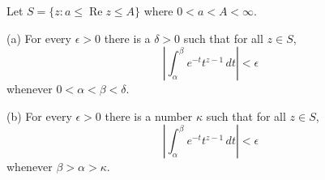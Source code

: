 Let $S = \{z : a \leq \operatorname{Re} z \leq A\}$ where $0 < a < A < \infty$.

(a) For every $\epsilon > 0$ there is a $\delta > 0$ such that for all $z \in S$,
$$\left| \int_{\alpha}^{\beta} e^{-t} t^{z-1} \, dt \right| < \epsilon$$
whenever $0 < \alpha < \beta < \delta$.

(b) For every $\epsilon > 0$ there is a number $\kappa$ such that for all $z \in S$,
$$\left| \int_{\alpha}^{\beta} e^{-t} t^{z-1} \, dt \right| < \epsilon$$
whenever $\beta > \alpha > \kappa$.

